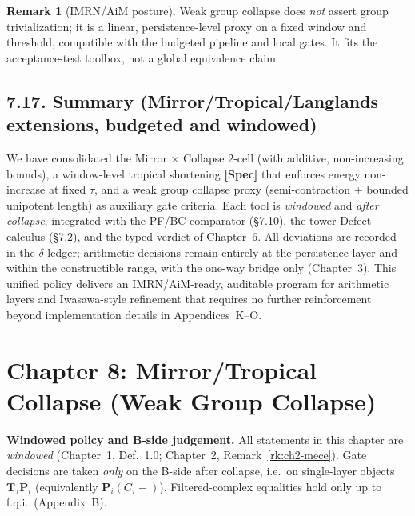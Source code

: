 \documentclass[11pt]{article}
\numberwithin{equation}{section}
\theoremstyle{plain}
\theoremstyle{definition}
\theoremstyle{remark}
\DeclareRobustCommand{\hyp}{\nobreakdash-}
\theoremstyle{plain}
\theoremstyle{definition}
\numberwithin{equation}{section}
\theoremstyle{definition}
\newtheorem{remark}[theorem]{Remark}
\numberwithin{equation}{section}
\theoremstyle{plain}
\theoremstyle{definition}
\theoremstyle{remark}
\begin{document}
\begin{remark}[IMRN/AiM posture]
Weak group collapse does \emph{not} assert group trivialization; it is a linear, persistence\hyp level proxy on a fixed window and threshold, compatible with the budgeted pipeline and local gates. It fits the acceptance\hyp test toolbox, not a global equivalence claim.
\end{remark}

\subsection*{7.17. Summary (Mirror/Tropical/Langlands extensions, budgeted and windowed)}
We have consolidated the Mirror × Collapse \(2\)\hyp cell (with additive, non\hyp increasing bounds), a window\hyp level tropical shortening \textbf{[Spec]} that enforces energy non\hyp increase at fixed \(\tau\), and a weak group collapse proxy (semi\hyp contraction + bounded unipotent length) as auxiliary gate criteria. Each tool is \emph{windowed} and \emph{after collapse}, integrated with the PF/BC comparator (§7.10), the tower Defect calculus (§7.2), and the typed verdict of Chapter~6. All deviations are recorded in the \(\delta\)\hyp ledger; arithmetic decisions remain entirely at the persistence layer and within the constructible range, with the one\hyp way bridge only (Chapter~3). This unified policy delivers an IMRN/AiM\hyp ready, auditable program for arithmetic layers and Iwasawa\hyp style refinement that requires no further reinforcement beyond implementation details in Appendices~K–O.



\section{Chapter 8: Mirror/Tropical Collapse (Weak Group Collapse)}

\noindent\textbf{Windowed policy and B-side judgement.}
All statements in this chapter are \emph{windowed} (Chapter~1, Def.~1.0; Chapter~2, Remark~\ref{rk:ch2-mece}).
Gate decisions are taken \emph{only} on the B-side after collapse, i.e.\ on single-layer objects
\(\mathbf{T}_\tau\mathbf{P}_i\) (equivalently \(\mathbf{P}_i(C_\tau-)\)).
Filtered-complex equalities hold only up to f.q.i.\ (Appendix~B).
\end{document}
